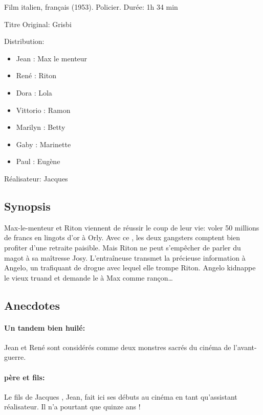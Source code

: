Film italien, français (1953). Policier. Durée: 1h 34 min

Titre Original: Grisbi

Distribution:

\begin{itemize}
	\item Jean : Max le menteur	
	\item René : Riton
	\item Dora : Lola	
	\item Vittorio : Ramon	
	\item Marilyn : Betty	
	\item Gaby : Marinette	
	\item Paul : Eugène
\end{itemize}

Réalisateur: Jacques 


\subsection*{Synopsis}

Max-le-menteur et Riton viennent de réussir le coup de leur vie: voler 50 millions de francs en lingots d'or à Orly. Avec ce , les deux gangsters comptent bien profiter d'une retraite paisible. Mais Riton ne peut s'empêcher de parler du magot à sa maîtresse Josy. L'entraîneuse transmet la précieuse information à Angelo, un trafiquant de drogue avec lequel elle trompe Riton. Angelo kidnappe le vieux truand et demande le  à Max comme rançon\dots{}


\subsection*{Anecdotes}

\paragraph{Un tandem bien huilé:} Jean  et René  sont considérés comme deux monstres sacrés du cinéma de l'avant-guerre.

\paragraph{ père et fils:} Le fils de Jacques , Jean, fait ici ses débuts au cinéma en tant qu'assistant réalisateur. Il n'a pourtant que quinze ans !

